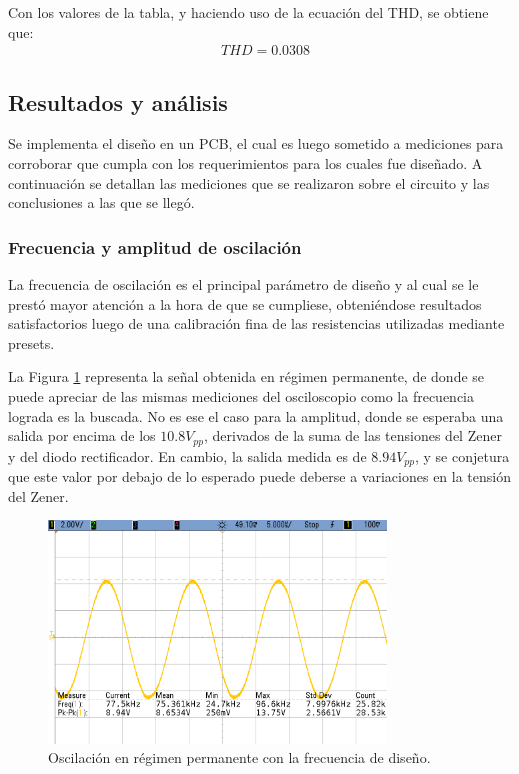 Con los valores de la tabla, y haciendo uso de la ecuación del THD, se obtiene que:
\begin{align*}
    & THD = 0.0308
\end{align*}



\subsection{Resultados y análisis}
Se implementa el diseño en un PCB, el cual es luego sometido a mediciones para corroborar que cumpla con los requerimientos para los cuales fue diseñado.
A continuación se detallan las mediciones que se realizaron sobre el circuito y las conclusiones a las que se llegó.


\subsubsection{Frecuencia y amplitud de oscilación}
La frecuencia de oscilación es el principal parámetro de diseño y al cual se le prestó mayor atención a la hora de que se cumpliese, obteniéndose resultados 
satisfactorios luego de una calibración fina de las resistencias utilizadas mediante presets.

La Figura \ref{fig:actual_freq_ex1} representa la señal obtenida en régimen permanente, de donde se puede apreciar de las mismas mediciones del osciloscopio 
como la frecuencia lograda es la buscada.
No es ese el caso para la amplitud, donde se esperaba una salida por encima de los $10.8 V_{pp}$, derivados de la suma de las tensiones del Zener y del 
diodo rectificador.
En cambio, la salida medida es de $8.94V_{pp}$, y se conjetura que este valor por debajo de lo esperado puede deberse a variaciones en la tensión del Zener.
\begin{figure}[H]
    \centering
    \includegraphics[width=0.8\textwidth]{../EJ1/Recursos/actual_freq.png}
    \caption{Oscilación en régimen permanente con la frecuencia de diseño.}
    \label{fig:actual_freq_ex1}    
\end{figure}

